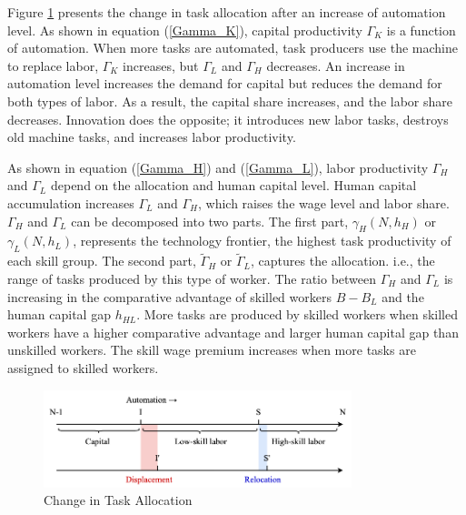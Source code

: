 \documentclass[12pt]{article}
\begin{document}
Figure \ref{allocation2} presents the change in task allocation after an increase of automation level. As shown in equation (\ref{Gamma_K}), capital productivity $\Gamma_K$ is a function of automation. When more tasks are automated, task producers use the machine to replace labor, $\Gamma_K$ increases, but $\Gamma_L$ and $\Gamma_H$ decreases. An increase in automation level increases the demand for capital but reduces the demand for both types of labor. As a result, the capital share increases, and the labor share decreases. Innovation does the opposite; it introduces new labor tasks, destroys old machine tasks, and increases labor productivity. 

As shown in equation (\ref{Gamma_H}) and (\ref{Gamma_L}), labor productivity $\Gamma_H$ and $\Gamma_L$ depend on the allocation and human capital level. Human capital accumulation increases $\Gamma_L$ and $\Gamma_H$, which raises the wage level and labor share. $\Gamma_H$ and $\Gamma_L$ can be decomposed into two parts. The first part, $\gamma_H(N,h_H)$ or $\gamma_L(N,h_L)$, represents the technology frontier, the highest task productivity of each skill group. The second part, $\tilde{\Gamma}_H$ or $\tilde{\Gamma}_L$, captures the allocation. i.e., the range of tasks produced by this type of worker. The ratio between $\Gamma_H$ and $\Gamma_L$ is increasing in the comparative advantage of skilled workers $B-B_L$ and the human capital gap $h_{HL}$. More tasks are produced by skilled workers when skilled workers have a higher comparative advantage and larger human capital gap than unskilled workers. The skill wage premium increases when more tasks are assigned to skilled workers. 

\begin{figure}[h!]
\center
\includegraphics[width=0.8\textwidth]{allocation2}
\caption{Change in Task Allocation}
\label{allocation2}
\end{figure}
\end{document}
